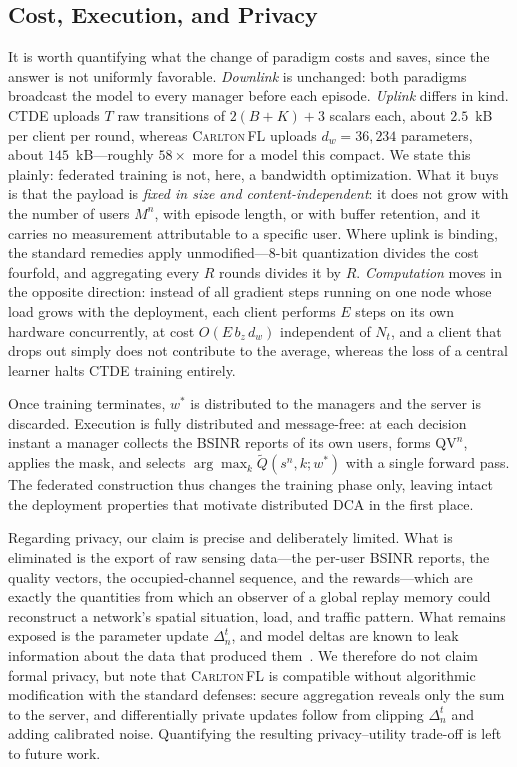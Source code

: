 \documentclass[journal]{IEEEtran}
\newcommand{\OURS}{\textsc{Carlton\,FL}}
\begin{document}
\subsection{Cost, Execution, and Privacy}
\label{subsec:method_cost}

It is worth quantifying what the change of paradigm costs and saves, since the
answer is not uniformly favorable. \emph{Downlink} is unchanged: both paradigms
broadcast the model to every manager before each episode. \emph{Uplink} differs
in kind. CTDE uploads $T$ raw transitions of $2(B+K)+3$ scalars each, about
$2.5$~kB per client per round, whereas \OURS{} uploads $d_{w}=36{,}234$
parameters, about $145$~kB---roughly $58\times$ more for a model this compact.
We state this plainly: federated training is not, here, a bandwidth
optimization. What it buys is that the payload is \emph{fixed in size and
content-independent}: it does not grow with the number of users $M^{n}$, with
episode length, or with buffer retention, and it carries no measurement
attributable to a specific user. Where uplink is binding, the standard remedies
apply unmodified---$8$-bit quantization divides the cost fourfold, and
aggregating every $R$ rounds divides it by $R$. \emph{Computation} moves in the
opposite direction: instead of all gradient steps running on one node whose
load grows with the deployment, each client performs $E$ steps on its own
hardware concurrently, at cost $O(E\,b_{z}\,d_{w})$ independent of $N_{t}$, and
a client that drops out simply does not contribute to the average, whereas the
loss of a central learner halts CTDE training entirely.

Once training terminates, $w^{*}$ is distributed to the managers and the server
is discarded. Execution is fully distributed and message-free: at each decision
instant a manager collects the BSINR reports of its own users, forms
$\mathrm{QV}^{n}$, applies the mask, and selects
$\arg\max_{k}\widetilde{Q}(s^{n},k;w^{*})$ with a single forward pass. The
federated construction thus changes the training phase only, leaving intact the
deployment properties that motivate distributed DCA in the first place.

Regarding privacy, our claim is precise and deliberately limited. What is
eliminated is the export of raw sensing data---the per-user BSINR reports, the
quality vectors, the occupied-channel sequence, and the rewards---which are
exactly the quantities from which an observer of a global replay memory could
reconstruct a network's spatial situation, load, and traffic pattern. What
remains exposed is the parameter update $\Delta^{t}_{n}$, and model deltas are
known to leak information about the data that produced
them~\cite{kairouz2021advances}. We therefore do not claim formal privacy, but
note that \OURS{} is compatible without algorithmic modification with the
standard defenses: secure aggregation reveals only the sum to the server, and
differentially private updates follow from clipping $\Delta^{t}_{n}$ and adding
calibrated noise. Quantifying the resulting privacy--utility trade-off is left
to future work.
\end{document}
